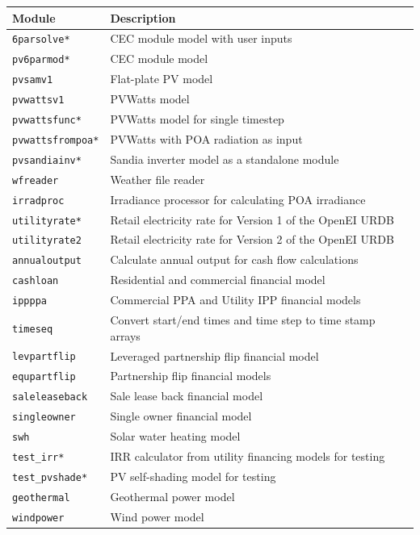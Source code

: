 \documentclass{scrartcl} %
\begin{document}
\begin{table}
\begin{center}
\begin{tabular}{ll}
Module & Description\\ \hline
\texttt{6parsolve*} & CEC module model with user inputs\\
\texttt{pv6parmod*} & CEC module model\\
\texttt{pvsamv1} & Flat-plate PV model\\
\texttt{pvwattsv1} & PVWatts model\\
\texttt{pvwattsfunc*} & PVWatts model for single timestep\\
\texttt{pvwattsfrompoa*} & PVWatts with POA radiation as input\\
\texttt{pvsandiainv*} & Sandia inverter model as a standalone module\\
\texttt{wfreader} & Weather file reader\\
\texttt{irradproc} & Irradiance processor for calculating POA irradiance\\
\texttt{utilityrate*} & Retail electricity rate for Version 1 of the OpenEI URDB\\
\texttt{utilityrate2} & Retail electricity rate for Version 2 of the OpenEI URDB\\
\texttt{annualoutput} & Calculate annual output for cash flow calculations\\
\texttt{cashloan} & Residential and commercial financial model\\
\texttt{ippppa} & Commercial PPA and Utility IPP financial models\\
\texttt{timeseq} & Convert start/end times and time step to time stamp arrays\\
\texttt{levpartflip} & Leveraged partnership flip financial model\\
\texttt{equpartflip} & Partnership flip financial models\\
\texttt{saleleaseback} & Sale lease back financial model\\
\texttt{singleowner} & Single owner financial model\\
\texttt{swh} & Solar water heating model\\
\texttt{test\_irr*} & IRR calculator from utility financing models for testing\\
\texttt{test\_pvshade*} & PV self-shading model for testing\\
\texttt{geothermal} & Geothermal power model\\
\texttt{windpower} & Wind power model\\

\end{tabular}
\end{center}
\end{table}
\end{document}

